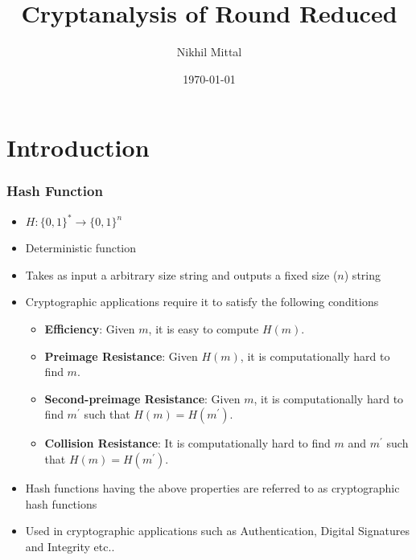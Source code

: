 \documentclass{beamer}
\title[Cryptanalysis of Round Reduced \KECCAK{}]{Cryptanalysis of Round Reduced \KECCAK{}} %
\author{Nikhil Mittal} %
\institute[17111056] %
{
	Under supervision of \\
	\large Prof. Manindra Agrawal and Dr. Shashank Singh\\
	\medskip
	IIT Kanpur \\ %
	\medskip
	\textit{nickedes@cse.iitk.ac.in} %
}
\date{\today} %
\begin{document}
	
	\begin{frame}
	\titlepage %
\end{frame}


\section{Introduction}

\begin{frame}
	\frametitle{Hash Function}
	\begin{itemize}
		\item $H:\{0,1\}^* \rightarrow \{0,1\}^n $
		\item Deterministic	function
		\item Takes as input a arbitrary size string and outputs a fixed size ($n$) string
		\item Cryptographic applications require it to satisfy the following conditions
		\begin{itemize}\setlength\itemindent{10pt}
			\item {\bf Efficiency}: Given $m$, it is easy to compute $H(m)$.
			\item {\bf Preimage Resistance}: Given $H(m)$, it is computationally hard to find $m$.
			\item {\bf Second-preimage Resistance}: Given $m$, it is computationally hard to find $m^\prime$ such that $H(m)=H(m^\prime)$.
			\item {\bf Collision Resistance}: It is computationally hard to find $m$ and $m^\prime$ such that $H(m)=H(m^\prime)$.
		\end{itemize}
		\item Hash functions having the above properties are referred to as cryptographic hash functions
		\item Used in cryptographic applications such as Authentication, Digital Signatures and Integrity etc..
	\end{itemize}
\end{frame}
\end{document}

